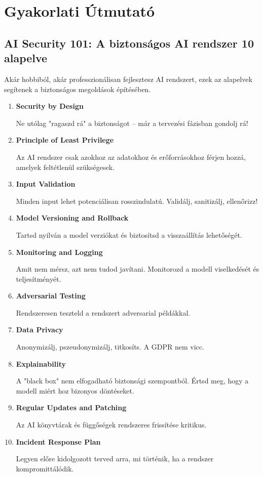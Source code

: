 \documentclass{../templates/magazine}
\begin{document}
\section{Gyakorlati Útmutató}

\subsection{AI Security 101: A biztonságos AI rendszer 10 alapelve}

Akár hobbiból, akár professzionálisan fejlesztesz AI rendszert, ezek az alapelvek segítenek a biztonságos megoldások építésében.

\begin{enumerate}
    \item \textbf{Security by Design}

    Ne utólag "ragaszd rá" a biztonságot -- már a tervezési fázisban gondolj rá!

    \item \textbf{Principle of Least Privilege}

    Az AI rendszer csak azokhoz az adatokhoz és erőforrásokhoz férjen hozzá, amelyek feltétlenül szükségesek.

    \item \textbf{Input Validation}

    Minden input lehet potenciálisan rosszindulatú. Validálj, sanitizálj, ellenőrizz!

    \item \textbf{Model Versioning and Rollback}

    Tartsd nyilván a model verziókat és biztosítsd a visszaállítás lehetőségét.

    \item \textbf{Monitoring and Logging}

    Amit nem mérsz, azt nem tudod javítani. Monitorozd a modell viselkedését és teljesítményét.

    \item \textbf{Adversarial Testing}

    Rendszeresen teszteld a rendszert adversarial példákkal.

    \item \textbf{Data Privacy}

    Anonymizálj, pszeudonymizálj, titkosíts. A GDPR nem vicc.

    \item \textbf{Explainability}

    A "black box" nem elfogadható biztonsági szempontból. Értsd meg, hogy a modell miért hoz bizonyos döntéseket.

    \item \textbf{Regular Updates and Patching}

    Az AI könyvtárak és függőségek rendszeres frissítése kritikus.

    \item \textbf{Incident Response Plan}

    Legyen előre kidolgozott terved arra, mi történik, ha a rendszer kompromittálódik.
\end{enumerate}
\end{document}
